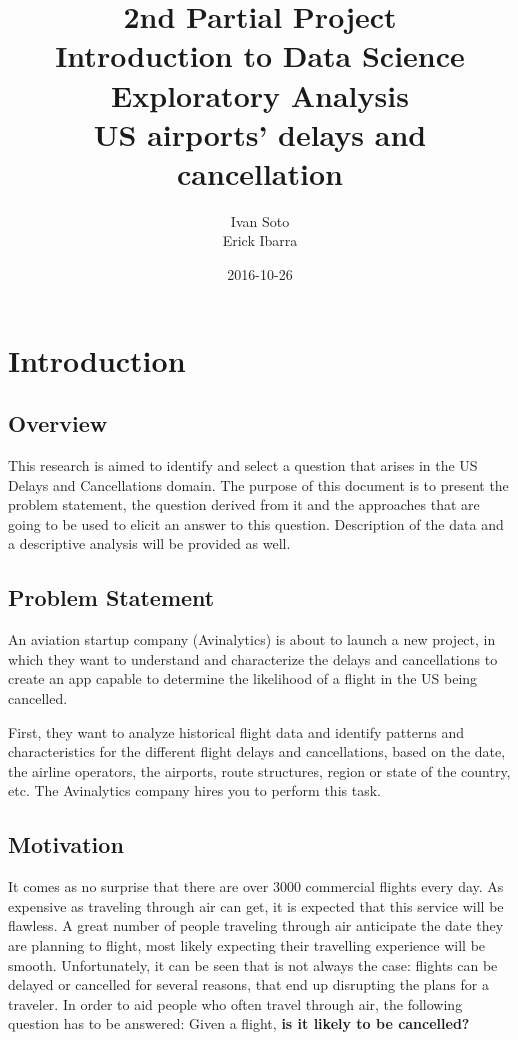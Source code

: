\documentclass{article}
\title{ {2nd Partial Project}\\
        Introduction to Data Science\\
        Exploratory Analysis\\
        US airports’ delays and cancellation}
\date{2016-10-26}
\author{Ivan Soto\\
        Erick Ibarra}
\begin{document}
    \maketitle
    \newpage
    \section{Introduction}
    \subsection{Overview}
    This research is aimed to identify and select a question that arises in the US Delays
    and Cancellations domain. The purpose of this document is to present the
    problem statement, the question derived from it and the approaches that are
    going to be used to elicit an answer to this question. Description of the
    data and a descriptive analysis will be provided as well.
    \subsection{Problem Statement}
    An aviation startup company (Avinalytics) is about to launch a new project, in which they want to understand and characterize the delays and cancellations to create an app capable to determine the likelihood of a flight in the US being cancelled.

First, they want to analyze historical flight data and identify patterns and characteristics for the different flight delays and cancellations, based on the date, the airline operators, the airports, route structures, region or state of the country, etc. The Avinalytics company hires you to perform this task.

    \subsection{Motivation}
    It comes as no surprise that there are over 3000 commercial flights every day.
    As expensive as traveling through air can get, it is expected that this
    service will be flawless. A great number of people traveling through air anticipate
    the date they are planning to flight, most likely expecting their travelling
    experience will be smooth. Unfortunately, it can be seen that is not always
    the case: flights can be delayed or cancelled for several reasons, that end
    up disrupting the plans for a traveler.\newline
    \indent In order to aid people who often travel through air, the following question
    has to be answered: Given a flight, \textbf{is it likely to be cancelled?}
\end{document}
